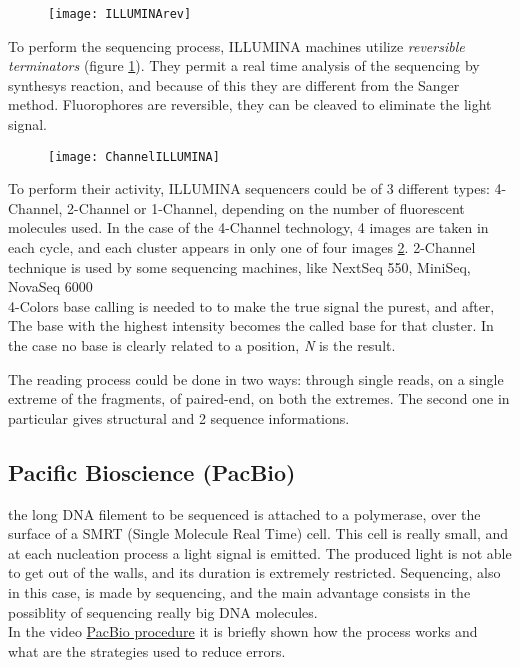 \begin{figure}[H]
\caption{}
\centering
\texttt{[image: ILLUMINArev]}
\label{ILLUMINArev}
\end{figure}

To perform the sequencing process, ILLUMINA machines utilize \textit{reversible terminators} (figure \ref{ILLUMINArev}). They permit a real time analysis of the sequencing by synthesys reaction, and because of this they are different from the Sanger method. Fluorophores are reversible, they can be cleaved to eliminate the light signal.

\begin{figure}[h]
\caption{}
\centering
\texttt{[image: ChannelILLUMINA]}
\label{ChannelILLUMINA}
\end{figure}

To perform their activity, ILLUMINA sequencers could be of 3 different types: 4-Channel, 2-Channel or 1-Channel, depending on the number of fluorescent molecules used. In the case of the 4-Channel technology, 4 images are taken in each cycle, and each  cluster appears in only one of four images \ref{ChannelILLUMINA}. 2-Channel technique is used by some sequencing machines, like NextSeq 550, MiniSeq, NovaSeq 6000\\

4-Colors base calling
is needed to to make
the true signal the purest, and after, The base with the highest intensity becomes the called base for that cluster. In the case no base is clearly related to a position, \textit{N} is the result.


The reading process could be done in two ways: through single reads, on a single extreme of the fragments, of paired-end, on both the extremes. The second one in particular gives structural and 2 sequence  informations.


\subsection{Pacific Bioscience (PacBio)}
the long DNA filement to be sequenced is attached to a polymerase, over the surface of a SMRT (Single Molecule Real Time) cell. This cell is really small, and at each nucleation process a light signal is emitted. The produced light is not able to get out of the walls, and its duration is extremely restricted. Sequencing, also in this case, is made by sequencing, and the main advantage consists in the possiblity of sequencing really big DNA molecules.\\
In the video \href{https://www.youtube.com/watch?v=_lD8JyAbwEo}{PacBio procedure} it is briefly shown how the process works and what are the strategies used to reduce errors.

